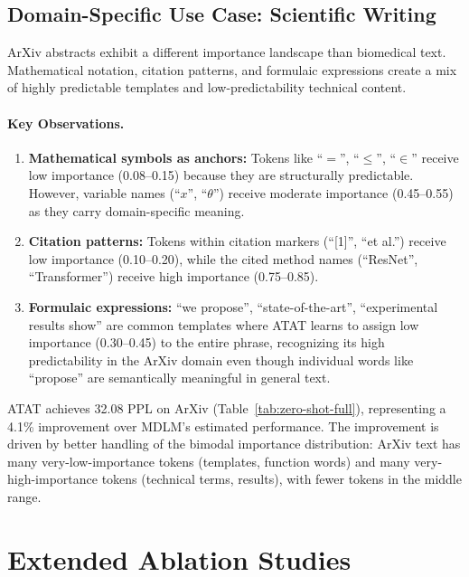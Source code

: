 \subsection{Domain-Specific Use Case: Scientific Writing}

ArXiv abstracts exhibit a different importance landscape than biomedical text. Mathematical notation, citation patterns, and formulaic expressions create a mix of highly predictable templates and low-predictability technical content.

\paragraph{Key Observations.}
\begin{enumerate}[leftmargin=*,itemsep=1pt]
    \item \textbf{Mathematical symbols as anchors:} Tokens like ``$=$'', ``$\leq$'', ``$\in$'' receive low importance (0.08--0.15) because they are structurally predictable. However, variable names (``$x$'', ``$\theta$'') receive moderate importance (0.45--0.55) as they carry domain-specific meaning.
    \item \textbf{Citation patterns:} Tokens within citation markers (``[1]'', ``et al.'') receive low importance (0.10--0.20), while the cited method names (``ResNet'', ``Transformer'') receive high importance (0.75--0.85).
    \item \textbf{Formulaic expressions:} ``we propose'', ``state-of-the-art'', ``experimental results show'' are common templates where ATAT learns to assign low importance (0.30--0.45) to the entire phrase, recognizing its high predictability in the ArXiv domain even though individual words like ``propose'' are semantically meaningful in general text.
\end{enumerate}

ATAT achieves 32.08 PPL on ArXiv (Table~\ref{tab:zero-shot-full}), representing a 4.1\% improvement over MDLM's estimated performance. The improvement is driven by better handling of the bimodal importance distribution: ArXiv text has many very-low-importance tokens (templates, function words) and many very-high-importance tokens (technical terms, results), with fewer tokens in the middle range.

\section{Extended Ablation Studies}
\label{app:extended-ablation}

